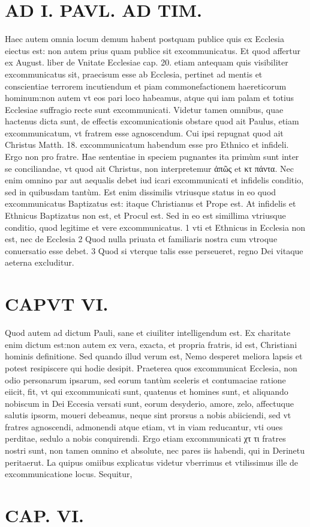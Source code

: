 \documentclass{article}
\begin{document}
\begin{pages}
\section*{AD I. PAVL. AD TIM. }
\marginpar{[ p.Feu. ]}\pstart Haec autem omnia locum demum habent postquam publice quis ex Ecclesia eiectus est: non autem prius quam publice sit excommunicatus. Et quod affertur ex August. liber  de Vnitate Ecclesiae cap. 20. etiam antequam quis visibiliter excommunicatus sit, praecisum esse ab Ecclesia, pertinet ad mentis et conscientiae terrorem incutiendum et piam commonefactionem haereticorum hominum:non autem vt eos pari loco habeamus, atque qui iam palam et totius Ecclesiae suffragio recte sunt excommunicati.  \pend\pstart Videtur tamen omnibus, quae hactenus dicta sunt, de effectis excomunicationis obstare quod ait Paulus, etiam excommunicatum, vt fratrem esse agnoscendum. Cui ipsi repugnat quod ait Christus Matth. 18. excommunicatum habendum esse pro Ethnico et infideli. Ergo non pro fratre. Hae sententiae in speciem pugnantes ita primùm sunt inter se conciliandae, vt quod ait Christus, non interpretemur ἀπῶς et κτ πάντα. Nec enim omnino par aut aequalis debet iud icari excommunicati et infidelis conditio, sed in quibusdam tantùm. Est enim dissimilis vtriusque status in eo quod excommunicatus Baptizatus est: itaque Christianus et Prope est. At infidelis et Ethnicus Baptizatus non est, et Procul est. Sed in eo est simillima vtriusque conditio, quod legitime et vere excommunicatus. 1 vti et Ethnicus in Ecclesia non est, nec de Ecclesia 2 Quod nulla priuata et familiaris nostra cum vtroque conuersatio esse debet. 3 Quod si vterque talis esse perseueret, regno Dei vitaque aeterna excluditur.  \pend
\section*{CAPVT VI. }
\marginpar{[ p.409 ]}\pstart Quod autem ad dictum Pauli, sane et ciuiliter intelligendum est. Ex charitate enim dictum est:non autem ex vera, exacta, et propria fratris, id est, Christiani hominis definitione. Sed quando illud verum est, Nemo desperet meliora lapsis et potest resipiscere qui hodie desipit. Praeterea quos excommunicat Ecclesia, non odio personarum ipsarum, sed eorum tantùm sceleris et contumaciae ratione eiicit, fit, vt qui excommunicati sunt, quatenus et homines sunt, et aliquando nobiscum in Dei Eccesia versati sunt, eorum desyderio, amore, zelo, affectuque salutis ipsorm, moueri debeamus, neque sint prorsus a nobis abiiciendi, sed vt fratres agnoscendi, admonendi atque etiam, vt in viam reducantur, vti oues perditae, sedulo a nobis conquirendi. Ergo etiam excommunicati χτ τι fratres nostri sunt, non tamen omnino et absolute, nec pares iis habendi, qui in Derinetu peritaerut. La quipus omiibus explicatus videtur vberrimus et vtilissimus ille de excommunicatione locus. Sequitur,  \pend
\endnumbering\beginnumbering\section{CAP. VI.}
{}

\end{pages}
\end{document}
